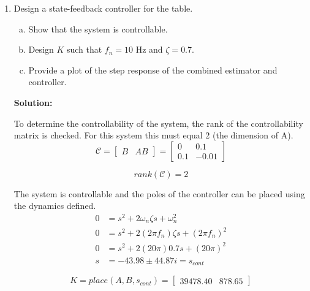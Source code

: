 \documentclass[11pt]{article}
\newcommand{\solution}{\textbf{Solution: \\}}
\begin{document}
\begin{enumerate}[label=\textbf{\arabic*.}]
  \vspace{24pt}
  \item Design a state-feedback controller for the table.
  \begin{enumerate}[(a)]
    \itemsep -6pt
    \item Show that the system is controllable.
    \item Design $K$ such that $f_n=10$ Hz and $\zeta=0.7$.
    \item Provide a plot of the step response of the combined estimator and controller.
  \end{enumerate}
  \solution

  To determine the controllability of the system, the rank of the controllability 
  matrix is checked. For this system this must equal 2 (the dimension of A).
  \begin{equation}
    \mathcal{C} = 
    \begin{bmatrix}
      B & AB
    \end{bmatrix}
    =
    \begin{bmatrix}
      0 & 0.1 \\ 0.1 & -0.01
    \end{bmatrix}
  \end{equation}

  \begin{equation}
    rank(\mathcal{C}) = 2
  \end{equation}

  The system is controllable and the poles of the controller can be placed using the 
  dynamics defined.
  \begin{equation}
    \begin{split}
      0 &= s^2 + 2 \omega_n \zeta s + \omega_n^2 \\
      0 &= s^2 + 2 (2 \pi f_n) \zeta s + (2 \pi f_n)^2 \\
      0 &= s^2 + 2 (20 \pi) 0.7 s + (20 \pi)^2 \\
      s &= -43.98 \pm 44.87i = s_{cont}
    \end{split}
  \end{equation}

  \begin{equation}
    K = place(A, B, s_{cont}) =
    \begin{bmatrix}
      39478.40 & 878.65
    \end{bmatrix}
  \end{equation}


\end{enumerate}
\end{document}
